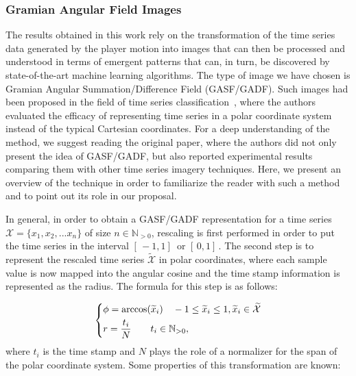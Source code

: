 \subsubsection{Gramian Angular Field Images}

The results obtained in this work rely on the transformation of the time series data generated by the player motion into images that can then be processed and understood in terms of emergent patterns that can, in turn, be discovered by state-of-the-art machine learning algorithms. The type of image we have chosen is Gramian Angular Summation/Difference Field (GASF/GADF). Such images had been proposed in the field of time series classification~\cite{wang_imaging_2015}, where the authors evaluated the efficacy of representing time series in a polar coordinate system instead of the typical Cartesian coordinates. For a deep understanding of the method, we suggest reading the original paper, where the authors did not only present the idea of GASF/GADF, but also reported experimental results comparing them with other time series imagery techniques. Here, we present an overview of the technique in order to familiarize the reader with such a method and to point out its role in our proposal.

In general, in order to obtain a GASF/GADF representation for a time series $\mathcal{X}=\{x_{1}, x_{2}, ... x_{n}\}$ of size $n \in \mathbb{N}_{>0}$, rescaling is first performed in order to put the time series in the interval $[\,-1,1] \,$ or $[\,0,1]\,$. The second step is to represent the rescaled time series $\widetilde{\mathcal{X}}$ in polar coordinates, where each sample value is now mapped into the angular cosine and the time stamp information is represented as the radius. 
The formula for this step is as follows:

\begin{equation}
\begin{dcases}
  \phi = \arccos(\widetilde{x}_{i}) \quad -1 \leq \widetilde{x}_{i} \leq 1, \widetilde{x}_{i} \in \widetilde{\mathcal{X}} \\
  r = \frac{t_{i}}{N} \quad \quad t_{i} \in \mathbb{N}_{>0},
\end{dcases}
\label{equation:GAF}
\end{equation} 
where $t_{i}$ is the time stamp and $N$ plays the role of a normalizer for the span of the polar coordinate system. Some properties of this transformation are known:


